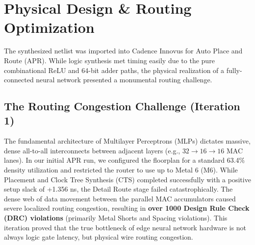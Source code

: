 \section{Physical Design \& Routing Optimization}
\label{sec:physical_design}

The synthesized netlist was imported into Cadence Innovus for Auto Place and Route (APR). While logic synthesis met timing easily due to the pure combinational ReLU and 64-bit adder paths, the physical realization of a fully-connected neural network presented a monumental routing challenge.

\subsection{The Routing Congestion Challenge (Iteration 1)}
The fundamental architecture of Multilayer Perceptrons (MLPs) dictates massive, dense all-to-all interconnects between adjacent layers (e.g., $32 \to 16 \to 16$ MAC lanes). 
In our initial APR run, we configured the floorplan for a standard 63.4\% density utilization and restricted the router to use up to Metal 6 (M6). 
While Placement and Clock Tree Synthesis (CTS) completed successfully with a positive setup slack of +1.356 ns, the Detail Route stage failed catastrophically. The dense web of data movement between the parallel MAC accumulators caused severe localized routing congestion, resulting in \textbf{over 1000 Design Rule Check (DRC) violations} (primarily Metal Shorts and Spacing violations). 
This iteration proved that the true bottleneck of edge neural network hardware is not always logic gate latency, but physical wire routing congestion.

